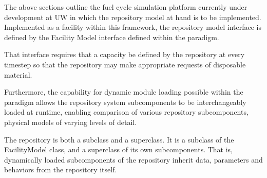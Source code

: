 The above sections outline the fuel cycle simulation platform
currently under development at \gls{UW} in which the repository model
at hand is to be implemented.  Implemented as a facility within this 
framework, the repository model interface is defined by the Facility
Model interface defined within the \Cyclus paradigm. 

That interface requires that a capacity be defined by the repository at every 
\Cyclus timestep so that the repository may make appropriate requests of 
disposable material.

Furthermore, the capability for dynamic module loading possible within 
the \Cyclus paradigm allows the repository system subcomponents to be 
interchangeably loaded at runtime, enabling comparison of various 
repository subcomponents, physical models of varying levels of detail. 

The repository is both a subclass and a superclass. It is a subclass of the 
FacilityModel class, and a superclass of its own subcomponents. That is, 
dynamically loaded subcomponents of the repository inherit data, parameters and 
behaviors from the repository itself. 





